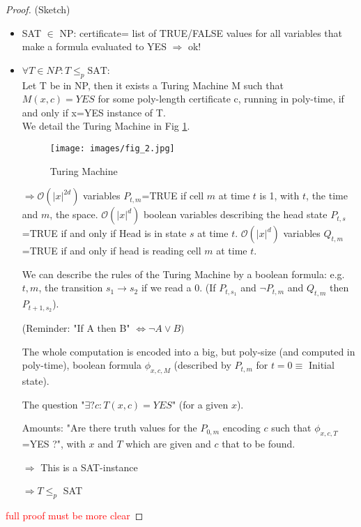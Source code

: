 \begin{proof}
(Sketch) 
\begin{itemize}
\item SAT $\in$ NP: certificate= list of TRUE/FALSE values for all variables that make a formula evaluated to YES $\Rightarrow$ ok!
\item  $\forall T \in NP: T \leq_p \text{SAT}$: \\ Let T be in NP, then it exists a Turing Machine M such that $M(x,c)=YES$ for some poly-length certificate c, running in poly-time, if and only if x=YES instance of T.\\
 
We detail the Turing Machine in Fig \ref{c12:turing machine}. 

\begin{figure}[h!]
\centering
\texttt{[image: images/fig\_2.jpg]}
\caption{Turing Machine}
\label{c12:turing machine}
\end{figure}

 $\Rightarrow \mathcal{O}\left( \vert x \vert^{2d} \right)$ variables $P_{t,m}$=TRUE if cell $m$ at time $t$ is 1, with $t$, the time and $m$, the space. $\mathcal{O}\left( \vert x \vert^{d} \right)$ boolean variables describing the head state $P_{t,s}$=TRUE if and only if Head is in state $s$ at time $t$. $\mathcal{O}\left( \vert x \vert^{d} \right)$ variables $Q_{t,m}$=TRUE if and only if head is reading cell $m$ at time $t$. 
 
 We can describe the rules of the Turing Machine by a boolean formula: e.g. $t,m$, the transition $s_1 \longrightarrow s_2$ if we read a $0$. (If $P_{t,s_1}$ and $\neg P_{t,m}$ and $Q_{t,m}$ then $P_{t+1,s_2}$).
 
(Reminder: "If A then B" $\Leftrightarrow \neg A \vee B)$ 

The whole computation is encoded into a big, but poly-size (and computed in poly-time), boolean formula $\phi_{x,c,M}$ (described by $P_{t,m}$ for $t=0\equiv$ Initial state). 

The question "$\exists ? c: T(x,c)=YES$" (for a given $x$). 

Amounts: "Are there truth values for the $P_{0,m}$ encoding $c$ such that $\phi_{x,c,T}$=YES ?", with $x$ and $T$ which are given and $c$ that to be found. 

$\Rightarrow$ This is a SAT-instance 

$\Rightarrow T \leq_{p} $ SAT
\end{itemize} 

\textcolor{red}{full proof must be more clear}
\end{proof}

